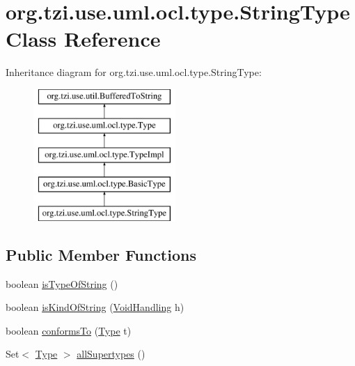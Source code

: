 \hypertarget{classorg_1_1tzi_1_1use_1_1uml_1_1ocl_1_1type_1_1_string_type}{\section{org.\-tzi.\-use.\-uml.\-ocl.\-type.\-String\-Type Class Reference}
\label{classorg_1_1tzi_1_1use_1_1uml_1_1ocl_1_1type_1_1_string_type}
}
Inheritance diagram for org.\-tzi.\-use.\-uml.\-ocl.\-type.\-String\-Type\-:\begin{figure}[H]
\begin{center}
\leavevmode
\includegraphics[height=5.000000cm]{classorg_1_1tzi_1_1use_1_1uml_1_1ocl_1_1type_1_1_string_type}
\end{center}
\end{figure}
\subsection*{Public Member Functions}
\begin{DoxyCompactItemize}
\item 
boolean \hyperlink{classorg_1_1tzi_1_1use_1_1uml_1_1ocl_1_1type_1_1_string_type_acc22e2c1bc1fb935e5a704d0a695e871}{is\-Type\-Of\-String} ()
\item 
boolean \hyperlink{classorg_1_1tzi_1_1use_1_1uml_1_1ocl_1_1type_1_1_string_type_a8272eb70c88dbccbfe92a6e70c30ed6f}{is\-Kind\-Of\-String} (\hyperlink{enumorg_1_1tzi_1_1use_1_1uml_1_1ocl_1_1type_1_1_type_1_1_void_handling}{Void\-Handling} h)
\item 
boolean \hyperlink{classorg_1_1tzi_1_1use_1_1uml_1_1ocl_1_1type_1_1_string_type_a2026b0cd4c296ab938e22973a01f55eb}{conforms\-To} (\hyperlink{interfaceorg_1_1tzi_1_1use_1_1uml_1_1ocl_1_1type_1_1_type}{Type} t)
\item 
Set$<$ \hyperlink{interfaceorg_1_1tzi_1_1use_1_1uml_1_1ocl_1_1type_1_1_type}{Type} $>$ \hyperlink{classorg_1_1tzi_1_1use_1_1uml_1_1ocl_1_1type_1_1_string_type_a2f35053dcc862681d6c28a5363c54f57}{all\-Supertypes} ()
\end{DoxyCompactItemize}
